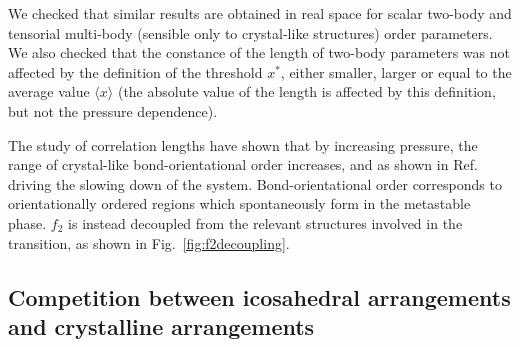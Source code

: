 \documentclass[twocolumn,superscriptaddress]{revtex4-1}
\begin{document}
We checked that similar results are obtained in real space for scalar two-body and tensorial multi-body (sensible only to crystal-like structures) order parameters. We also checked that the constance of the length of two-body parameters was not affected by the definition of the threshold $x^*$, either smaller, larger or equal to the average value $\langle x\rangle$ (the absolute value of the length is affected by this definition, but not the pressure dependence).

The study of correlation lengths have shown that by increasing pressure, the range of
crystal-like bond-orientational order increases, and as shown in Ref.~\cite{tanaka,mathieu_icosahedra}
driving the slowing down of the system. Bond-orientational order corresponds to
orientationally ordered regions which spontaneously form in the metastable phase.
$f_2$ is instead decoupled from the relevant structures involved in the transition, as
shown in Fig.~\ref{fig:f2decoupling}.





\subsection{Competition between icosahedral arrangements and crystalline arrangements}
\end{document}
